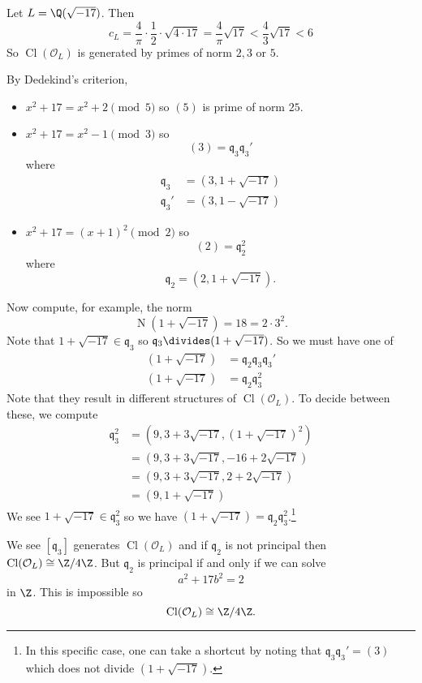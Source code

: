 \documentclass[a4paper]{article}
\renewcommand*{\O}{\mathcal{O}}
\DeclareMathOperator{\n}{N}
\DeclareMathOperator{\Cl}{Cl}%
\begin{document}
\begin{eg}
  Let \(L = \Q(\sqrt{-17})\). Then
  \[
    c_L = \frac{4}{\pi} \cdot \frac{1}{2} \cdot \sqrt{4 \cdot 17} = \frac{4}{\pi} \sqrt{17} < \frac{4}{3} \sqrt{17} < 6
  \]
  So \(\Cl(\O_L)\) is generated by primes of norm \(2, 3\) or \(5\).

  By Dedekind's criterion,
  \begin{itemize}
  \item \(x^2 + 17 = x^2 + 2 \pmod 5\) so \((5)\) is prime of norm \(25\).
  \item \(x^2 + 17 = x^2 - 1 \pmod 3\) so
    \[
      (3) = \mathfrak q_3 \mathfrak q_3'
    \]
    where
    \begin{align*}
      \mathfrak q_3 &= (3, 1 + \sqrt{-17}) \\
      \mathfrak q_3' &= (3, 1 - \sqrt{-17})
    \end{align*}
  \item \(x^2 + 17 = (x + 1)^2 \pmod 2\) so
    \[
      (2) = \mathfrak q_2^2
    \]
    where
    \[
      \mathfrak q_2 = (2, 1 + \sqrt{-17}).
    \]
  \end{itemize}
  Now compute, for example, the norm
  \[
    \n(1 + \sqrt{-17}) = 18 = 2 \cdot 3^2.
  \]
  Note that \(1 + \sqrt{-17} \in \mathfrak q_3\) so \(\mathfrak q_3 \divides (1 + \sqrt{-17})\). So we must have one of
  \begin{align*}
    (1 + \sqrt{-17}) &= \mathfrak q_2 \mathfrak q_3 \mathfrak q_3' \\
    (1 + \sqrt{-17}) &= \mathfrak q_2 \mathfrak q_3^2
  \end{align*}
  Note that they result in different structures of \(\Cl(\O_L)\). To decide between these, we compute
  \begin{align*}
    \mathfrak q_3^2
    &= (9, 3 + 3 \sqrt{-17}, (1 + \sqrt{-17})^2) \\
    &= (9, 3 + 3 \sqrt{-17}, -16 + 2 \sqrt{-17}) \\
    &= (9, 3 + 3 \sqrt{-17}, 2 + 2 \sqrt{-17}) \\
    &= (9, 1 + \sqrt{-17})
  \end{align*}
  We see \(1 + \sqrt{-17} \in \mathfrak q_3^2\) so we have \((1 + \sqrt{-17}) = \mathfrak q_2 \mathfrak q_3^2\).\footnote{In this specific case, one can take a shortcut by noting that \(\mathfrak q_3 \mathfrak q_3' = (3)\) which does not divide \((1 + \sqrt{-17})\).}

  We see \([\mathfrak q_3]\) generates \(\Cl(\O_L)\) and if \(\mathfrak q_2\) is not principal then \(\Cl(\O_L) \cong \Z/4\Z\). But \(\mathfrak q_2\) is principal if and only if we can solve
  \[
    a^2 + 17b^2 = 2
  \]
  in \(\Z\). This is impossible so
  \[
    \Cl(\O_L) \cong \Z/4\Z.
  \]
\end{eg}
\end{document}
